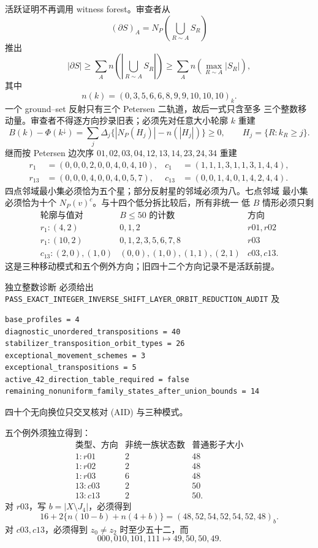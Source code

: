 活跃证明不再调用 witness forest。审查者从
\[
(\partial S)_A=N_P\!\left(\bigcup_{R\sim A}S_R\right)
\]
推出
\[
|\partial S|\ge
\sum_A n\!\left(\left|\bigcup_{R\sim A}S_R\right|\right)
\ge
\sum_A n\!\left(\max_{R\sim A}|S_R|\right),
\]
其中
\[
n(k)=(0,3,5,6,6,8,9,9,10,10,10)_k.
\]
一个 ground--set 反射只有三个 Petersen 二轨道，故后一式只含至多
三个整数移动量。审查者不得逐方向抄录旧表；必须先对任意大小轮廓
\(k\) 重建
\[
B(k)-\Phi(k^\downarrow)
=\sum_j\Delta_j\{|N_P(H_j)|-n(|H_j|)\}\ge0,
\qquad H_j=\{R:k_R\ge j\}.                                    \tag{AID}
\]
继而按 Petersen 边次序 \(01,02,03,04,12,13,14,23,24,34\) 重建
\[
\begin{aligned}
r_1&=(0,0,0,2,0,0,4,0,4,10),&
c_1&=(1,1,1,3,1,1,3,1,4,4),\\
r_{13}&=(0,0,0,4,0,0,4,0,5,7),&
c_{13}&=(0,0,1,4,0,1,4,2,4,4).
\end{aligned}
\]
四点邻域最小集必须恰为五个星；部分反射星的邻域必须为八。七点邻域
最小集必须恰为十个 \(N_P(v)^c\)。与十四个低分拆比较后，所有非统一
低 \(B\) 情形必须只剩
\[
\begin{array}{c|c|c}
\text{轮廓与值对}&B\le50\text{ 的计数}&\text{方向}\\ \hline
r_1:(4,2)&0,1,2&r01,r02\\
r_1:(10,2)&0,1,2,3,5,6,7,8&r03\\
c_{13}:(2,0),(1,0)&(0,0),(1,0),(1,1),(2,1)&c03,c13.
\end{array}
\]
这是三种移动模式和五个例外方向；旧四十二个方向记录不是活跃前提。

独立整数诊断
必须给出
\texttt{PASS\_EXACT\_INTEGER\_INVERSE\_SHIFT\_LAYER\_ORBIT\_REDUCTION\_AUDIT}
及
\begin{verbatim}
base_profiles = 4
diagnostic_unordered_transpositions = 40
stabilizer_transposition_orbit_types = 26
exceptional_movement_schemes = 3
exceptional_transpositions = 5
active_42_direction_table_required = false
remaining_nonuniform_family_states_after_union_bounds = 14
\end{verbatim}
四十个无向换位只交叉核对 (AID) 与三种模式。

五个例外须独立得到：
\[
\begin{array}{c|c|c}
\text{类型、方向}&\text{非统一族状态数}&\text{普通影子大小}\\ \hline
1:r01&2&48\\
1:r02&2&48\\
1:r03&6&48\\
13:c03&2&50\\
13:c13&2&50.
\end{array}
\]
对 \(r03\)，写 \(b=|X\setminus J_4|\)，必须得到
\[
16+2\{n(10-b)+n(4+b)\}
=(48,52,54,52,54,52,48)_b.
\]
对 \(c03,c13\)，必须得到 \(z_0\ne z_2\) 时至少五十二，而
\[
000,010,101,111\longmapsto49,50,50,49.
\]

